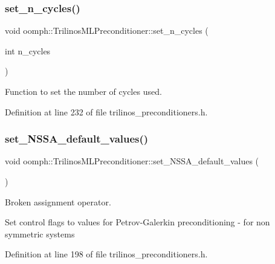 \subsubsection{\texorpdfstring{set\+\_\+n\+\_\+cycles()}{set\_n\_cycles()}}
{\footnotesize\ttfamily void oomph\+::\+Trilinos\+M\+L\+Preconditioner\+::set\+\_\+n\+\_\+cycles (\begin{DoxyParamCaption}\item[{int}]{n\+\_\+cycles }\end{DoxyParamCaption})\hspace{0.3cm}{\ttfamily [inline]}}



Function to set the number of cycles used. 



Definition at line 232 of file trilinos\+\_\+preconditioners.\+h.

\mbox{\label{classoomph_1_1TrilinosMLPreconditioner_aa52463ce0cef9095c44dfaa08afd53bd}} 
\subsubsection{\texorpdfstring{set\+\_\+\+N\+S\+S\+A\+\_\+default\+\_\+values()}{set\_NSSA\_default\_values()}}
{\footnotesize\ttfamily void oomph\+::\+Trilinos\+M\+L\+Preconditioner\+::set\+\_\+\+N\+S\+S\+A\+\_\+default\+\_\+values (\begin{DoxyParamCaption}{ }\end{DoxyParamCaption})\hspace{0.3cm}{\ttfamily [inline]}}



Broken assignment operator. 

Set control flags to values for Petrov-\/\+Galerkin preconditioning -\/ for non symmetric systems 

Definition at line 198 of file trilinos\+\_\+preconditioners.\+h.

\mbox{\label{classoomph_1_1TrilinosMLPreconditioner_ae368c529ccddfe884ff0dd7a00401602}} 
